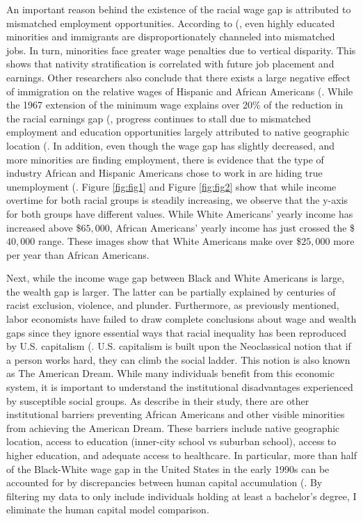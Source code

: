 \documentclass[12pt, english]{article}
\begin{document}
An important reason behind the existence of the racial wage gap is attributed to mismatched employment opportunities. According to (\citet{LuLi2021}, even highly educated minorities and immigrants are disproportionately channeled into mismatched jobs. In turn, minorities face greater wage penalties due to vertical disparity. This shows that nativity stratification is correlated with future job placement and earnings. Other researchers also conclude that there exists a large negative effect of immigration on the relative wages of Hispanic and African Americans (\citet{McCall2001}. While the 1967 extension of the minimum wage explains over 20\% of the reduction in the racial earnings gap (\citet{DerenoncourtMontialoux2020}, progress continues to stall due to mismatched employment and education opportunities largely attributed to native geographic location (\citet{LuLi2021}. In addition, even though the wage gap has slightly decreased, and more minorities are finding employment, there is evidence that the type of industry African and Hispanic Americans chose to work in are hiding true unemployment (\citet{LangLehmannJee-Yeon2012}. Figure \ref{fig:fig1} and Figure \ref{fig:fig2} show that while income overtime for both racial groups is steadily increasing, we observe that the y-axis for both groups have different values. While White Americans' yearly income has increased above \$$65,000$, African Americans' yearly income has just crossed the \$$40,000$ range. These images show that White Americans make over \$$25,000$ more per year than African Americans.
	
Next, while the income wage gap between Black and White Americans is large, the wealth gap is larger. The latter can be partially explained by centuries of racist exclusion, violence, and plunder. Furthermore, as previously mentioned, labor economists have failed to draw complete conclusions about wage and wealth gaps since they ignore essential ways that racial inequality has been reproduced by U.S. capitalism (\citet{Koechlin2019}. U.S. capitalism is built upon the Neoclassical notion that if a person works hard, they can climb the social ladder. This notion is also known as The American Dream. While many individuals benefit from this economic system, it is important to understand the institutional disadvantages experienced by susceptible social groups. As \citet{LuLi2021} describe in their study, there are other institutional barriers preventing African Americans and other visible minorities from achieving the American Dream. These barriers include native geographic location, access to education (inner-city school vs suburban school), access to higher education, and adequate access to healthcare. In particular, more than half of the Black-White wage gap in the United States in the early 1990s can be accounted for by discrepancies between human capital accumulation (\citet{Koechlin2019}. By filtering my data to only include individuals holding at least a bachelor's degree, I eliminate the human capital model comparison.
\end{document}
